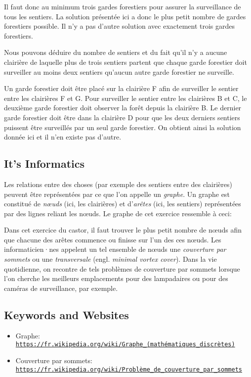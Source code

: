 \documentclass[a4paper,11pt]{report}
\newcommand{\BrochureUrlText}[1]{\texttt{#1}}
\newcommand{\taskGraphicsFolder}{..}
\begin{document}
Il faut donc au minimum trois gardes forestiers pour assurer la surveillance de tous les sentiers. La solution présentée ici a donc le plus petit nombre de gardes forestiers possible. Il n’y a pas d’autre solution avec exactement trois gardes forestiers.

Nous pouvons déduire du nombre de sentiers et du fait qu’il n’y a aucune clairière de laquelle plus de trois sentiers partent que chaque garde forestier doit surveiller au moins deux sentiers qu’aucun autre garde forestier ne surveille.

Un garde forestier doit être placé sur la clairière F afin de surveiller le sentier entre les clairières F et G. Pour surveiller le sentier entre les clairières B et C, le deuxième garde forestier doit observer la forêt depuis la clairière B. Le dernier garde forestier doit être dans la clairière D pour que les deux derniers sentiers puissent être surveillés par un seul garde forestier. On obtient ainsi la solution donnée ici et il n’en existe pas d’autre.


\subsection*{It’s Informatics}

Les relations entre des choses (par exemple des sentiers entre des clairières) peuvent être représentées par ce que l’on appelle un \emph{graphe}. Un graphe est constitué de \emph{nœuds} (ici, les clairières) et d’\emph{arêtes} (ici, les sentiers) représentées par des lignes reliant les nœuds. Le graphe de cet exercice ressemble à ceci:

{\centering%
\par}

Dans cet exercice du castor, il faut trouver le plus petit nombre de nœuds afin que chacune des arêtes commence ou finisse sur l’un des ces nœuds. Les informaticien·nes appelent un tel ensemble de nœuds une \emph{couverture par sommets} ou une \emph{transversale} (engl. \emph{minimal vortex cover}). Dans la vie quotidienne, on recontre de tels problèmes de couverture par sommets lorsque l’on cherche les meilleurs emplacements pour des lampadaires ou pour des caméras de surveillance, par exemple.

{\raggedright

\subsection*{Keywords and Websites}

\begin{itemize}
  \item Graphe: \href{https://fr.wikipedia.org/wiki/Graphe_(math\%C3\%A9matiques_discr\%C3\%A8tes)}{\BrochureUrlText{https://fr.wikipedia.org/wiki/Graphe\_(mathématiques\_discrètes)}}
  \item Couverture par sommets: \href{https://fr.wikipedia.org/wiki/Probl\%C3\%A8me_de_couverture_par_sommets}{\BrochureUrlText{https://fr.wikipedia.org/wiki/Problème\_de\_couverture\_par\_sommets}}
\end{itemize}


}
\end{document}

